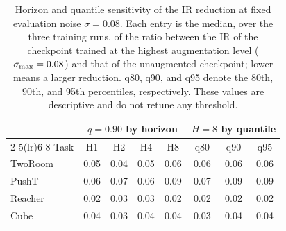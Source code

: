 \begin{table}[H]
\centering
\caption{Horizon and quantile sensitivity of the IR reduction at fixed evaluation noise $\sigma=0.08$. Each entry is the median, over the three training runs, of the ratio between the IR of the checkpoint trained at the highest augmentation level ($\sigma_{\max}{}=0.08$) and that of the unaugmented checkpoint; lower means a larger reduction. q80, q90, and q95 denote the 80th, 90th, and 95th percentiles, respectively. These values are descriptive and do not retune any threshold.}
\label{tab:horizon-quantile-sensitivity}
\small
\setlength{\tabcolsep}{5pt}
\begin{tabular}{lccccccc}
\toprule
& \multicolumn{4}{c}{$q=0.90$ by horizon} & \multicolumn{3}{c}{$H=8$ by quantile} \\
\cmidrule(lr){2-5}\cmidrule(lr){6-8}
Task & H1 & H2 & H4 & H8 & q80 & q90 & q95 \\
\midrule
TwoRoom & 0.05 & 0.04 & 0.05 & 0.06 & 0.06 & 0.06 & 0.06 \\
PushT & 0.06 & 0.07 & 0.06 & 0.09 & 0.07 & 0.09 & 0.09 \\
Reacher & 0.02 & 0.03 & 0.03 & 0.02 & 0.02 & 0.02 & 0.02 \\
Cube & 0.04 & 0.03 & 0.04 & 0.04 & 0.03 & 0.04 & 0.04 \\
\bottomrule
\end{tabular}
\end{table}
